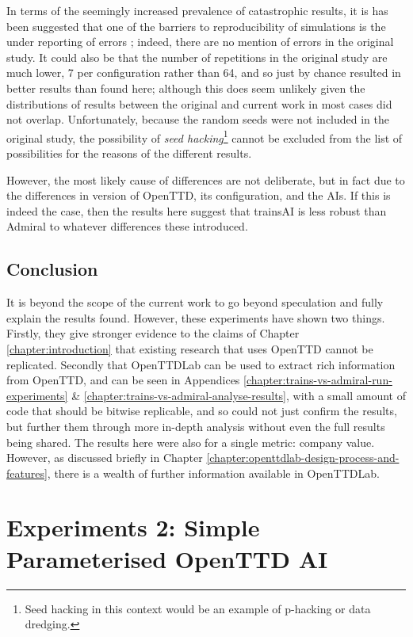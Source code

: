 \documentclass[logo,msc,dsti]{style/infthesis}    %
\newcommand{\singlespacedfootnote}[1]{{\singlespace\footnote{#1}}}
\begin{document}
{In terms of the seemingly increased prevalence of catastrophic results, it is has been suggested that one of the barriers to reproducibility of simulations is the under reporting of errors \cite{luijken2024replicability}; indeed, there are no mention of errors in the original study. It could also be that the number of repetitions in the original study are much lower, 7 per configuration rather than 64, and so just by chance resulted in better results than found here; although this does seem unlikely given the distributions of results between the original and current work in most cases did not overlap. Unfortunately, because the random seeds were not included in the original study, the possibility of \emph{seed hacking}\singlespacedfootnote{Seed hacking in this context would be an example of p-hacking or data dredging.} cannot be excluded from the list of possibilities for the reasons of the different results.

However, the most likely cause of differences are not deliberate, but in fact due to the differences in version of OpenTTD, its configuration, and the AIs. If this is indeed the case, then the results here suggest that trainsAI is less robust than Admiral to whatever differences these introduced.

\section{Conclusion}

It is beyond the scope of the current work to go beyond speculation and fully explain the results found. However, these experiments have shown two things. Firstly, they give stronger evidence to the claims of Chapter \ref{chapter:introduction} that existing research that uses OpenTTD cannot be replicated. Secondly that OpenTTDLab can be used to extract rich information from OpenTTD, and can be seen in Appendices \ref{chapter:trains-vs-admiral-run-experiments} \& \ref{chapter:trains-vs-admiral-analyse-results}, with a small amount of code that should be bitwise replicable, and so could not just confirm the results, but further them through more in-depth analysis without even the full results being shared. The results here were also for a single metric: company value. However, as discussed briefly in Chapter \ref{chapter:openttdlab-design-process-and-features}, there is a wealth of further information available in OpenTTDLab.

\chapter{Experiments 2: Simple Parameterised OpenTTD AI}
\label{chapter:experiments-simple-parameterised-ai}

}
\end{document}
